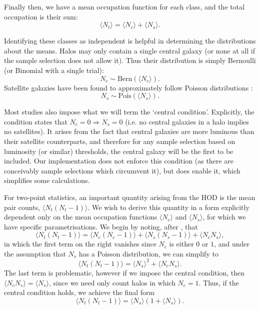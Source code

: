 \documentclass[5p]{elsarticle}
\newcommand{\Nc}{\langle N_c \rangle}
\newcommand{\Ns}{\langle N_s \rangle}
\newcommand{\Nt}{\langle N_t \rangle}
\begin{document}
Finally then, we have a mean occupation function for each class, and the total occupation is their sum:
\begin{equation}
    \Nt = \Nc + \Ns.
\end{equation}

Identifying these classes as independent is helpful in determining the distributions about the means. Halos may only contain a single central galaxy (or none at all if the sample selection does not allow it). Thus their distribution is simply Bernoulli (or Binomial with a single trial):
\begin{equation}
    N_c \sim \text{Bern}(\Nc).
\end{equation}
Satellite galaxies have been found to approximately follow Poisson distributions \citep{Kauffmann2004,Zheng2005}:
\begin{equation}
    N_s \sim \text{Pois}(\Ns).
\end{equation}

Most studies also impose what we will term the `central condition'. Explicitly, the condition states that $N_c = 0 \Rightarrow N_s = 0$ (i.e. no central galaxies in a halo implies no satellites).
It arises from the fact that central galaxies are more luminous than their satellite counterparts, and therefore for any sample selection based on luminosity (or similar) thresholds, the central galaxy will be the first to be included.  Our implementation does not enforce this condition (as there are conceivably sample selections which circumvent it), but does enable it, which simplifies some calculations.

For two-point statistics, an important quantity arising from the HOD is the mean pair counts, $\langle N_t(N_t-1) \rangle$. We wish to derive this quantity in a form explicitly dependent only on the mean occupation functions $\Nc$ and $\Ns$, for which we have specific parametrisations. We begin by noting, after \citet{Zheng2005}, that
\begin{equation}
    \langle N_t(N_t-1) \rangle = \langle N_c(N_c-1) \rangle + \langle N_s(N_s-1) \rangle + \langle N_c N_s \rangle,
\end{equation}
in which the first term on the right vanishes since $N_c$ is either $0$ or $1$, and under the assumption that $N_s$ has a Poisson distribution, we can simplify to
\begin{equation}
    \label{eq:nt_pairs}
    \langle N_t(N_t-1) \rangle = \Ns^2 + \langle N_c N_s \rangle.
\end{equation}
The last term is problematic, however if we impose the central condition, then $\langle N_c N_s \rangle = \Ns$, since we need only count halos in which $N_c = 1$. Thus, if the central condition holds, we achieve the final form
\begin{equation}
    \langle N_t(N_t-1) \rangle = \Ns(1 + \Ns).
\end{equation}
\end{document}
